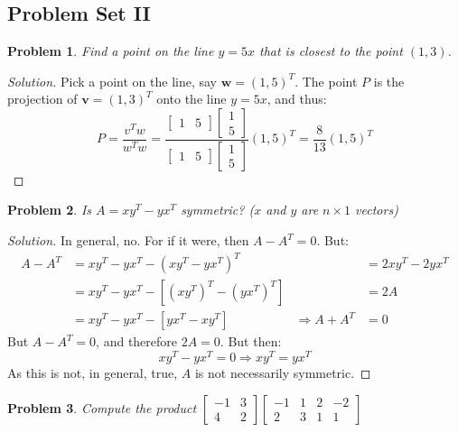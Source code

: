 \documentclass{article}
\theoremstyle{mystyle}
\newtheorem{problem}{Problem}[section]
\begin{document}
\subsection{Problem Set II}
\begin{problem}
Find a point on the line $y=5x$ that is closest to the point $(1,3)$.
\end{problem}
\begin{proof}[Solution]
Pick a point on the line, say $\mathbf{w} = (1,5)^T$. The point $P$ is the projection of $\mathbf{v} = (1,3)^T$ onto the line $y=5x$, and thus:
\begin{equation*}
    P = \frac{v^T w}{w^T w} = \frac{\begin{bmatrix}1 & 5 \end{bmatrix}\begin{bmatrix}1 \\ 5\end{bmatrix}}{\begin{bmatrix}1 & 5 \end{bmatrix}\begin{bmatrix}1 \\ 5\end{bmatrix}}(1,5)^T = \frac{8}{13}(1,5)^T
\end{equation*}
\end{proof}
\begin{problem}
Is $A = xy^T - yx^T$ symmetric? ($x$ and $y$ are $n\times 1$ vectors)
\end{problem}
\begin{proof}[Solution]
In general, no. For if it were, then $A-A^T = 0$. But:
\begin{align*}
    A-A^T &= xy^T - yx^T - (xy^T-yx^T)^T & &= 2xy^T-2yx^T\\
    &= xy^T - yx^T -[(xy^T)^T-(yx^T)^T] & &= 2A\\
    &= xy^T - yx^T - [yx^T - xy^T] & \Rightarrow A+A^{T}&=0 
\end{align*}
But $A-A^{T} = 0$, and therefore $2A = 0$. But then:
\begin{equation*}
    xy^T - yx^T = 0 \Rightarrow xy^T = yx^T    
\end{equation*}
As this is not, in general, true, $A$ is not necessarily symmetric.
\end{proof}
\begin{problem}
Compute the product $\begin{bmatrix} -1 & 3 \\ 4 & 2 \end{bmatrix} \begin{bmatrix} -1 & 1 & 2 & -2 \\ 2 & 3 & 1 & 1 \end{bmatrix}$
\end{problem}
\end{document}
